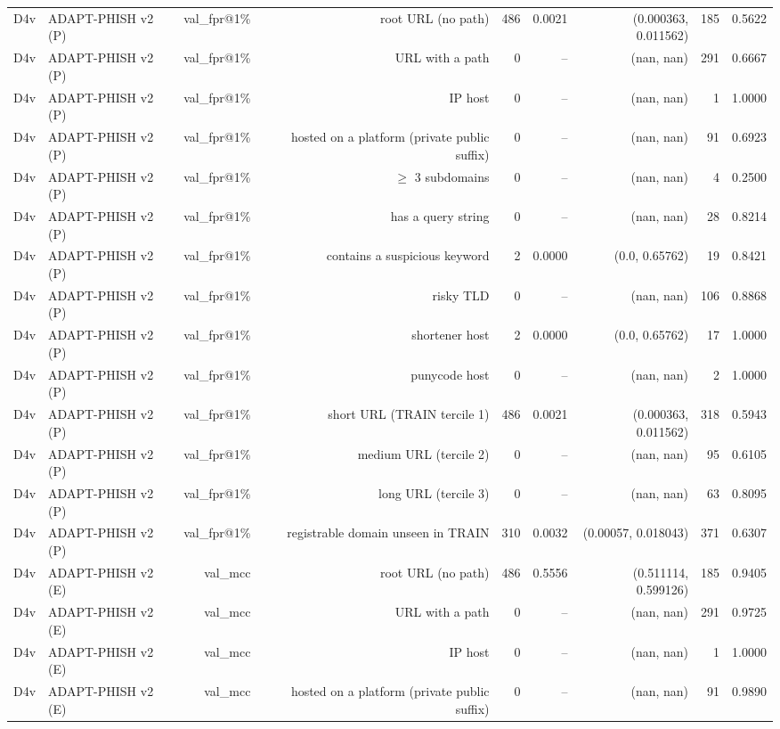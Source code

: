 \begin{table}[t]
\begin{tabular}{llrrrrrrr}
D4v & ADAPT-PHISH v2 (P) & val\_fpr@1\% & root URL (no path) & 486 & 0.0021 & (0.000363, 0.011562) & 185 & 0.5622 \\
D4v & ADAPT-PHISH v2 (P) & val\_fpr@1\% & URL with a path & 0 & -- & (nan, nan) & 291 & 0.6667 \\
D4v & ADAPT-PHISH v2 (P) & val\_fpr@1\% & IP host & 0 & -- & (nan, nan) & 1 & 1.0000 \\
D4v & ADAPT-PHISH v2 (P) & val\_fpr@1\% & hosted on a platform (private public suffix) & 0 & -- & (nan, nan) & 91 & 0.6923 \\
D4v & ADAPT-PHISH v2 (P) & val\_fpr@1\% & $\geq$ 3 subdomains & 0 & -- & (nan, nan) & 4 & 0.2500 \\
D4v & ADAPT-PHISH v2 (P) & val\_fpr@1\% & has a query string & 0 & -- & (nan, nan) & 28 & 0.8214 \\
D4v & ADAPT-PHISH v2 (P) & val\_fpr@1\% & contains a suspicious keyword & 2 & 0.0000 & (0.0, 0.65762) & 19 & 0.8421 \\
D4v & ADAPT-PHISH v2 (P) & val\_fpr@1\% & risky TLD & 0 & -- & (nan, nan) & 106 & 0.8868 \\
D4v & ADAPT-PHISH v2 (P) & val\_fpr@1\% & shortener host & 2 & 0.0000 & (0.0, 0.65762) & 17 & 1.0000 \\
D4v & ADAPT-PHISH v2 (P) & val\_fpr@1\% & punycode host & 0 & -- & (nan, nan) & 2 & 1.0000 \\
D4v & ADAPT-PHISH v2 (P) & val\_fpr@1\% & short URL (TRAIN tercile 1) & 486 & 0.0021 & (0.000363, 0.011562) & 318 & 0.5943 \\
D4v & ADAPT-PHISH v2 (P) & val\_fpr@1\% & medium URL (tercile 2) & 0 & -- & (nan, nan) & 95 & 0.6105 \\
D4v & ADAPT-PHISH v2 (P) & val\_fpr@1\% & long URL (tercile 3) & 0 & -- & (nan, nan) & 63 & 0.8095 \\
D4v & ADAPT-PHISH v2 (P) & val\_fpr@1\% & registrable domain unseen in TRAIN & 310 & 0.0032 & (0.00057, 0.018043) & 371 & 0.6307 \\
D4v & ADAPT-PHISH v2 (E) & val\_mcc & root URL (no path) & 486 & 0.5556 & (0.511114, 0.599126) & 185 & 0.9405 \\
D4v & ADAPT-PHISH v2 (E) & val\_mcc & URL with a path & 0 & -- & (nan, nan) & 291 & 0.9725 \\
D4v & ADAPT-PHISH v2 (E) & val\_mcc & IP host & 0 & -- & (nan, nan) & 1 & 1.0000 \\
D4v & ADAPT-PHISH v2 (E) & val\_mcc & hosted on a platform (private public suffix) & 0 & -- & (nan, nan) & 91 & 0.9890 \\

\end{tabular}
\end{table}
